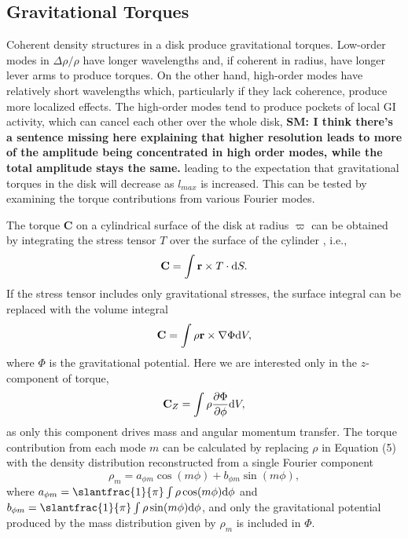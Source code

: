 \documentclass[manuscript]{aastex} %
\begin{document}
\subsection{Gravitational Torques}

Coherent density structures in a disk produce gravitational torques. Low-order modes in $\Delta\rho / \rho$  have longer wavelengths and, if coherent in radius, have longer lever arms to produce torques. On the other hand, high-order modes have relatively short wavelengths which, particularly if they lack coherence, produce more localized effects. The high-order modes tend to produce pockets of local GI activity, which can cancel each other
over the whole disk, {\bf SM: I think there's a sentence missing here explaining that higher resolution leads to more of the amplitude being concentrated in high order modes, while the total amplitude stays the same.} leading to the expectation that  gravitational torques in the disk will decrease as $l_{max}$ is increased. This can be tested by examining the torque contributions from  various Fourier modes.

The torque {\bf C} on a cylindrical surface of the disk at radius $\varpi$ can be obtained by integrating the stress tensor $T$ over the surface of the cylinder \citep{lyndenbell1972}, i.e.,
\begin{equation}
{\rm {\bf C}} = \int {\bf r} \times T \cdot {\rm d}S.
\end{equation}
If the stress tensor includes only gravitational stresses, the surface integral can be replaced with the volume integral
\begin{equation}
{\rm \bf C} = \int \rho {\bf r} \times \nabla \Phi {\rm d}V,
\end{equation}
where $\Phi$ is the gravitational potential.  Here we are interested only in the $z$-component of torque,  
\begin{equation}
\label{torque1}
{\rm \bf C}_Z = \int \rho \frac{\partial\Phi} {\partial \phi} {\rm d}V,
\end{equation}
as only this component drives mass and angular momentum transfer. The torque contribution from each mode $m$ can be calculated by replacing $\rho$ in Equation (5) with the density distribution reconstructed from a single Fourier component
\begin{equation}
\rho_m = a_{\phi m} \cos(m\phi) + b_{\phi m} \sin(m\phi),
\end{equation}
where $a_{\phi m} =\slantfrac{1}{\pi} \int \rho \cos(m\phi){\rm d}\phi$ and $b_{\phi m} =\slantfrac{1}{\pi} \int \rho \sin(m\phi){\rm d}\phi$, and only the gravitational potential produced by the mass distribution given by $\rho_m$ is included in $\Phi$.
\end{document}
